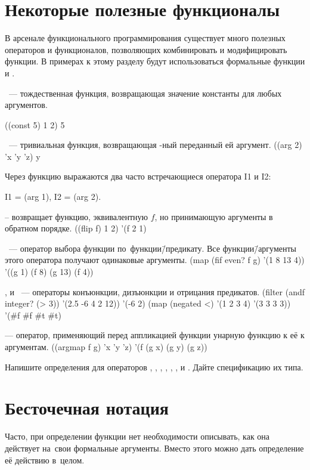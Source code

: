 \section{Некоторые полезные функционалы}\label{operators}%
В арсенале функционального программирования существует много полезных операторов и функционалов, позволяющих комбинировать и модифицировать функции. В примерах к этому разделу будут использоваться формальные функции  и .

\medskip
{}~--- тождественная функция, возвращающая значение константы  для любых аргументов.

\REPL
  {((const 5) 1 2)}
  {5}


\medskip
{}~--- тривиальная функция, возвращающая -ный переданный ей аргумент.
\REPL
  {((arg 2) 'x 'y 'z)}
  {y}

Через функцию  выражаются два часто встречающиеся оператора \si{I1} и \si{I2}:
\begin{SchemeCode}
  I1 = (arg 1),   I2 = (arg 2).
\end{SchemeCode}

\medskip
{} -- возвращает функцию, эквивалентную $f$, но принимающую аргументы в обратном порядке.
\REPL
  {((flip f) 1 2)}
  {'(f 2 1)}

\medskip
{}~--- оператор выбора функции по~функции\=/предикату. Все функции\=/аргументы этого оператора получают одинаковые аргументы.
\REPL
 {(map (fif even? f g) '(1 8 13 4))}
 {'((g 1) (f 8) (g 13) (f 4))}

\medskip
{},  и ~--- операторы конъюнкции, дизъюнкции и отрицания предикатов.
\REPL
  {(filter (andf integer? (> 3)) '(2.5 -6 4 2 12))}
  {'(-6 2)}
\REPL
  {(map (negated <) '(1 2 3 4) '(3 3 3 3))}
  {'(#f #f #t #t)}

\medskip
{} --- оператор, применяющий перед аппликацией функции  унарную функцию  к её к аргументам.
\REPL
  {((argmap f g) 'x 'y 'z)}
  {'(f (g x) (g y) (g z))}

\begin{Assignment}
Напишите определения для операторов , , , , , ,  и . Дайте спецификацию их типа.
\end{Assignment}

\section[2]{Бесточечная нотация}\label{tacit}%
Часто, при определении функции нет необходимости описывать, как она действует на~свои формальные аргументы. Вместо этого можно дать определение её действию в~целом.

